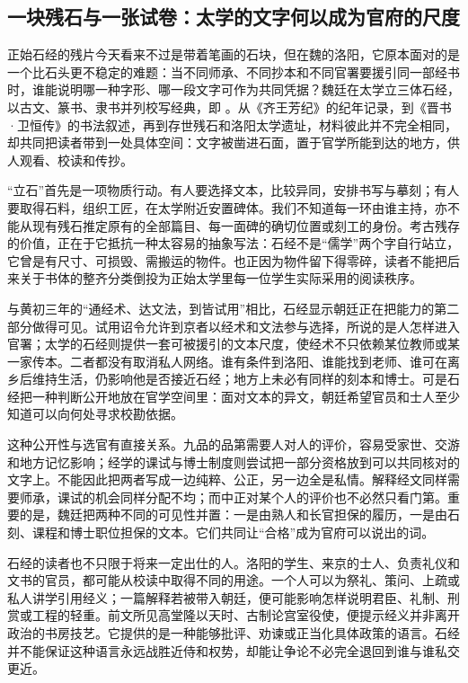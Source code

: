 \subsection{一块残石与一张试卷：太学的文字何以成为官府的尺度}

正始石经的残片今天看来不过是带着笔画的石块，但在魏的洛阳，它原本面对的是一个比石头更不稳定的难题：当不同师承、不同抄本和不同官署要援引同一部经书时，谁能说明哪一种字形、哪一段文字可作为共同凭据？魏廷在太学立三体石经，以古文、篆书、隶书并列校写经典，即
。从《齐王芳纪》的纪年记录，到《晋书·卫恒传》的书法叙述，再到存世残石和洛阳太学遗址，材料彼此并不完全相同，却共同把读者带到一处具体空间：文字被凿进石面，置于官学所能到达的地方，供人观看、校读和传抄。

“立石”首先是一项物质行动。有人要选择文本，比较异同，安排书写与摹刻；有人要取得石料，组织工匠，在太学附近安置碑体。我们不知道每一环由谁主持，亦不能从现有残石推定原有的全部篇目、每一面碑的确切位置或刻工的身份。考古残存的价值，正在于它抵抗一种太容易的抽象写法：石经不是“儒学”两个字自行站立，它曾是有尺寸、可损毁、需搬运的物件。也正因为物件留下得零碎，读者不能把后来关于书体的整齐分类倒投为正始太学里每一位学生实际采用的阅读秩序。

与黄初三年的“通经术、达文法，到皆试用”相比，石经显示朝廷正在把能力的第二部分做得可见。试用诏令允许到京者以经术和文法参与选择，所说的是人怎样进入官署；太学的石经则提供一套可被援引的文本尺度，使经术不只依赖某位教师或某一家传本。二者都没有取消私人网络。谁有条件到洛阳、谁能找到老师、谁可在离乡后维持生活，仍影响他是否接近石经；地方上未必有同样的刻本和博士。可是石经把一种判断公开地放在官学空间里：面对文本的异文，朝廷希望官员和士人至少知道可以向何处寻求校勘依据。

这种公开性与选官有直接关系。九品的品第需要人对人的评价，容易受家世、交游和地方记忆影响；经学的课试与博士制度则尝试把一部分资格放到可以共同核对的文字上。不能因此把两者写成一边纯粹、公正，另一边全是私情。解释经文同样需要师承，课试的机会同样分配不均；而中正对某个人的评价也不必然只看门第。重要的是，魏廷把两种不同的可见性并置：一是由熟人和长官担保的履历，一是由石刻、课程和博士职位担保的文本。它们共同让“合格”成为官府可以说出的词。

石经的读者也不只限于将来一定出仕的人。洛阳的学生、来京的士人、负责礼仪和文书的官员，都可能从校读中取得不同的用途。一个人可以为祭礼、策问、上疏或私人讲学引用经义；一篇解释若被带入朝廷，便可能影响怎样说明君臣、礼制、刑赏或工程的轻重。前文所见高堂隆以天时、古制论宫室役使，便提示经义并非离开政治的书房技艺。它提供的是一种能够批评、劝谏或正当化具体政策的语言。石经并不能保证这种语言永远战胜近侍和权势，却能让争论不必完全退回到谁与谁私交更近。

